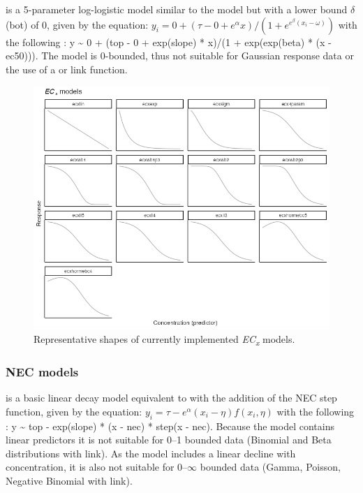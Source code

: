 \documentclass[
  shortnames]{jss}
\begin{document}
 is a 5-parameter log-logistic model similar to the  model but with a lower bound \(\delta\) (bot) of 0, given by the equation:
\(y_i = 0 + (\tau - 0 + e^{\alpha} x)/ (1 + e^{e^{\beta} (x_i - \omega)})\)
with the following : y \textasciitilde{} 0 + (top - 0 + exp(slope) * x)/(1 + exp(exp(beta) * (x - ec50))). The model is 0-bounded, thus not suitable for Gaussian response data or the use of a  or  link function.

\begin{figure}[ht]
  \centering
  \includegraphics[width=1\textwidth]{../vignettes/vignette-fig-exmp2b-theoretical_ecx_curves.png}
  \caption{Representative shapes of currently implemented  \textit{EC\textsubscript{x}} models.}
  \label{fig1}
\end{figure}

\subsubsection[NEC models]{NEC models}\label{nec-models}

 is a basic linear decay model equivalent to  with the addition of the NEC step function, given by the equation:
\(y_i = \tau - e^{\alpha} \left(x_i - \eta \right) f(x_i, \eta)\)
with the following : y \textasciitilde{} top - exp(slope) * (x - nec) * step(x - nec). Because the model contains linear predictors it is not suitable for 0--1 bounded data (Binomial and Beta distributions with  link). As the model includes a linear decline with concentration, it is also not suitable for 0--\(\infty\) bounded data (Gamma, Poisson, Negative Binomial with  link).
\end{document}
